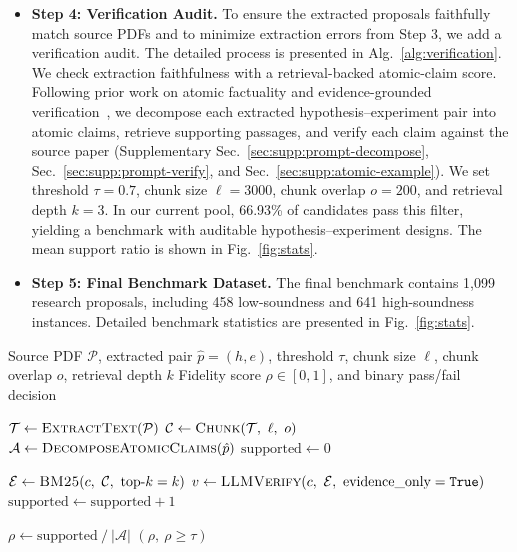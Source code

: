 \begin{itemize}[leftmargin=*,itemsep=0.1in, topsep=0in, parsep=0in]
    \item \textbf{Step 4: Verification Audit.} To ensure the extracted proposals faithfully match source PDFs and to minimize extraction errors from Step 3, we add a verification audit. The detailed process is presented in Alg.~\ref{alg:verification}. We check extraction faithfulness with a retrieval-backed atomic-claim score. Following prior work on atomic factuality and evidence-grounded verification~\citep{min-etal-2023-factscore,thorne2018fever}, we decompose each extracted hypothesis--experiment pair into atomic claims, retrieve supporting passages, and verify each claim against the source paper (Supplementary Sec.~\ref{sec:supp:prompt-decompose}, Sec.~\ref{sec:supp:prompt-verify}, and Sec.~\ref{sec:supp:atomic-example}). We set threshold $\tau=0.7$, chunk size $\ell=3000$, chunk overlap $o=200$, and retrieval depth $k=3$. In our current pool, 66.93\% of candidates pass this filter, yielding a benchmark with auditable hypothesis--experiment designs. The mean support ratio is shown in Fig.~\ref{fig:stats}.

    \item \textbf{Step 5: Final Benchmark Dataset.} The final benchmark contains 1,099 research proposals, including 458 low-soundness and 641 high-soundness instances. Detailed benchmark statistics are presented in Fig.~\ref{fig:stats}.
\end{itemize}

\begin{algorithm}[ht]
\caption{Verification Audit}
\label{alg:verification}
\begin{algorithmic}[1]
\Require Source PDF $\mathcal{P}$, extracted pair $\hat{p} = (h, e)$, 
         threshold $\tau$, chunk size $\ell$, chunk overlap $o$, retrieval depth $k$
\Ensure Fidelity score $\rho \in [0, 1]$, and binary pass/fail decision

\State $\mathcal{T} \leftarrow \textsc{ExtractText}(\mathcal{P})$
\State $\mathcal{C} \leftarrow \textsc{Chunk}(\mathcal{T},\ \ell,\ o)$
\State $\mathcal{A} \leftarrow \textsc{DecomposeAtomicClaims}(\hat{p})$
\State $\text{supported} \leftarrow 0$

    \State $\mathcal{E} \leftarrow \textsc{BM25}(c,\ \mathcal{C},\ \text{top-}k=k)$
    \State $v \leftarrow \textsc{LLMVerify}(c,\ \mathcal{E},\ \text{evidence\_only}=\texttt{True})$
        \State $\text{supported} \leftarrow \text{supported} + 1$
    \EndIf
\EndFor

\State $\rho \leftarrow \text{supported}\ /\ |\mathcal{A}|$
\State \Return $(\rho,\ \rho \geq \tau)$

\end{algorithmic}
\end{algorithm}



